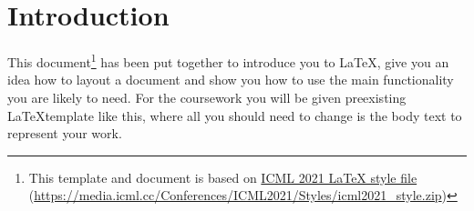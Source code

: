 \documentclass{article}
\begin{document}


\section{Introduction}

This document\footnote{This template and document is based on \href{https://media.icml.cc/Conferences/ICML2021/Styles/icml2021\_style.zip}{ICML 2021 LaTeX style file} (\url{https://media.icml.cc/Conferences/ICML2021/Styles/icml2021\_style.zip})} has been put together to introduce you to \LaTeX, give you an idea how to layout a document and show you how to use the main functionality you are likely to need. For the coursework you will be given preexisting \LaTeX template like this, where all you should need to change is the body text to represent your work.
\end{document}
